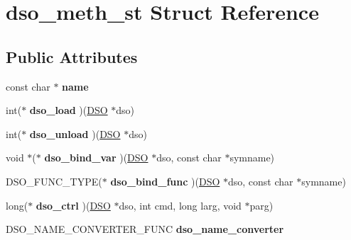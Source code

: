 \hypertarget{structdso__meth__st}{}\section{dso\+\_\+meth\+\_\+st Struct Reference}
\label{structdso__meth__st}
\subsection*{Public Attributes}
\begin{DoxyCompactItemize}
\item 
\mbox{\label{structdso__meth__st_aef9c2213572b32054a97a99954505d6e}} 
const char $\ast$ {\bfseries name}
\item 
\mbox{\label{structdso__meth__st_ad0931e27df22d21228272993683488b8}} 
int($\ast$ {\bfseries dso\+\_\+load} )(\hyperlink{structdso__st}{D\+SO} $\ast$dso)
\item 
\mbox{\label{structdso__meth__st_a330000d54dcc81e708bc60ef31ca9daf}} 
int($\ast$ {\bfseries dso\+\_\+unload} )(\hyperlink{structdso__st}{D\+SO} $\ast$dso)
\item 
\mbox{\label{structdso__meth__st_a64e053582cae745cef5ff6643b8258cb}} 
void $\ast$($\ast$ {\bfseries dso\+\_\+bind\+\_\+var} )(\hyperlink{structdso__st}{D\+SO} $\ast$dso, const char $\ast$symname)
\item 
\mbox{\label{structdso__meth__st_a6a179a5a759e8d6837055f217848e3db}} 
D\+S\+O\+\_\+\+F\+U\+N\+C\+\_\+\+T\+Y\+PE($\ast$ {\bfseries dso\+\_\+bind\+\_\+func} )(\hyperlink{structdso__st}{D\+SO} $\ast$dso, const char $\ast$symname)
\item 
\mbox{\label{structdso__meth__st_abc9ee5fe4894fa7bd80d37e1d20393ec}} 
long($\ast$ {\bfseries dso\+\_\+ctrl} )(\hyperlink{structdso__st}{D\+SO} $\ast$dso, int cmd, long larg, void $\ast$parg)
\item 
\mbox{\label{structdso__meth__st_a02abdcfb6f66b31d697d4bdc4ec647ba}} 
D\+S\+O\+\_\+\+N\+A\+M\+E\+\_\+\+C\+O\+N\+V\+E\+R\+T\+E\+R\+\_\+\+F\+U\+NC {\bfseries dso\+\_\+name\+\_\+converter}
\item 

\end{DoxyCompactItemize}
